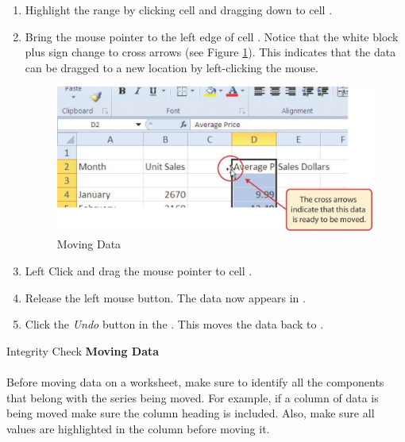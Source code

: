 \begin{enumbox}
	\begin{enumerate}
		\item Highlight the range  by clicking cell  and dragging down to cell .
		\item Bring the mouse pointer to the left edge of cell . Notice that the white block plus sign change to cross arrows (see Figure \ref{01:fig30}). This indicates that the data can be dragged to a new location by left-clicking the mouse.
	
		\begin{figure}[H]
			\centering
			\includegraphics[width=\maxwidth{.95\linewidth}]{gfx/ch01_fig30}
			\caption{Moving Data}
			\label{01:fig30}
		\end{figure}

		\item Left Click and drag the mouse pointer to cell .
		\item Release the left mouse button. The data now appears in .
		\item Click the \textit{Undo} button in the . This moves the data back to .
	\end{enumerate}
\end{enumbox}

\begin{center}
	\begin{infobox}{Integrity Check}
		\textbf{Moving Data}
		\\
		\\
		Before moving data on a worksheet, make sure to identify all the components that belong with the series being moved. For example, if a column of data is being moved make sure the column heading is included. Also, make sure all values are highlighted in the column before moving it.
	\end{infobox}
\end{center}


